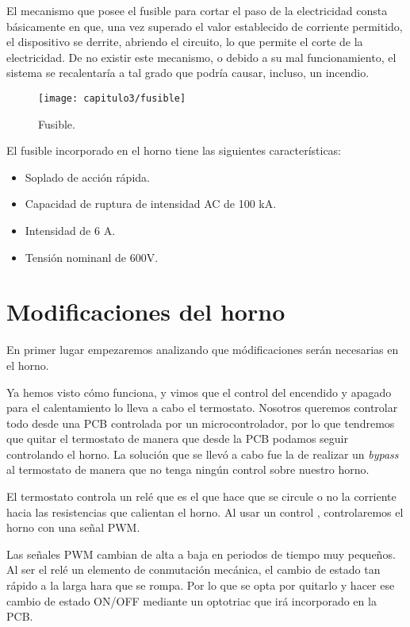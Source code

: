 El mecanismo que posee el fusible para cortar el paso de la electricidad consta básicamente en que, una vez superado el valor establecido de corriente permitido, el dispositivo se derrite, abriendo el circuito, lo que permite el corte de la electricidad. De no existir este mecanismo, o debido a su mal funcionamiento, el sistema se recalentaría a tal grado que podría causar, incluso, un incendio.

						
\begin{figure}[H]%
\noindent \begin{centering}
\texttt{[image: capitulo3/fusible]}
\par\end{centering}
\smallskip
\caption{\label{fig:fusible} Fusible.}
\end{figure}

El fusible incorporado en el horno tiene las siguientes características: 

\begin{itemize}
\item Soplado de acción rápida.
\item Capacidad de ruptura de intensidad AC de 100 kA.
\item Intensidad de 6 A.
\item Tensión nominanl de 600V.
\end{itemize}



\section{Modificaciones del horno}
En primer lugar empezaremos analizando que módificaciones serán necesarias en el horno. 

Ya hemos visto cómo funciona, y vimos que el control del encendido y apagado para el calentamiento lo lleva a cabo el termostato. Nosotros queremos controlar todo desde una \acrshort{PCB} controlada por un microcontrolador, por lo que tendremos que quitar el termostato de manera que desde la \acrshort{PCB} podamos seguir controlando el horno. La solución que se llevó a cabo fue la de realizar un \textit{bypass} al termostato de manera que no tenga ningún control sobre nuestro horno.

El termostato controla un relé que es el que hace que se circule o no la corriente hacia las resistencias que calientan el horno. Al usar un control , controlaremos el horno con una señal \acrshort{PWM}. 

Las señales \acrshort{PWM} cambian de alta a baja en periodos de tiempo muy pequeños. Al ser el relé un elemento de conmutación mecánica, el cambio de estado tan rápido a la larga hara que se rompa. Por lo que se opta por quitarlo y hacer ese cambio de estado ON/OFF mediante un optotriac que irá incorporado en la \acrshort{PCB}.

